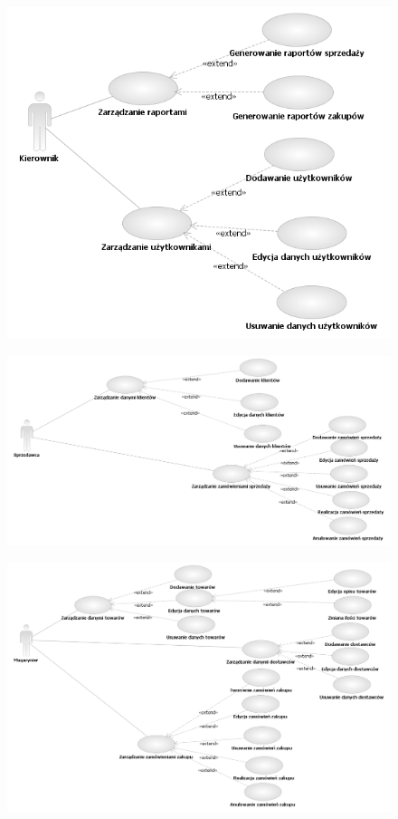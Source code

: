 \begin{figure}[h]
    \begin{center}
    \includegraphics[angle=-90,scale=0.8]{../img/kierownikUseCase.png}
    \end{center}
    \label{fig:kierownikUseCase}
\end{figure}

\begin{figure}[h]
    \begin{center}
    \includegraphics[angle=-90,scale=0.75]{../img/sprzedawcaUseCase.png}
    \end{center}
    \label{fig:sprzedawcaUseCase}
\end{figure}

\begin{figure}[h]
    \begin{center}
    \includegraphics[angle=-90,scale=0.75]{../img/magazynierUseCase.png}
    \end{center}
    \label{fig:magazynierUseCase}
\end{figure}